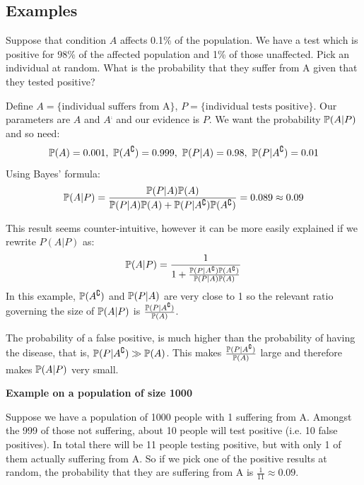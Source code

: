 \documentclass[../main.tex]{subfiles}
\begin{document}
\subsection{Examples}
\begin{example}
  Suppose that condition $A$ affects 0.1\% of the population.
  We have a test which is positive for 98\% of the affected population and 1\% of those unaffected.
  Pick an individual at random.
  What is the probability that they suffer from A given that they tested positive?

  Define $A = \{\text{individual suffers from A}\}$, $P =\{\text{individual tests positive}\}$.
  Our parameters are $A$ and $A^{\comp}$ and our evidence is $P$.
  We want the probability $\P(A \vert P)$ and so need:
  \[
    \P(A) = 0.001,\ \P(A^{\comp}) = 0.999,\ \P(P \vert A) = 0.98,\ \P(P \vert A^{\comp}) = 0.01
  \]
  Using Bayes' formula:
  \[
    \P(A \vert P) = \frac{\P(P \vert A)\P(A)}{\P(P \vert A)\P(A) + \P(P \vert A^{\comp})\P(A^{\comp})} = 0.089 \approx 0.09
  \]

  This result seems counter-intuitive, however it can be more easily explained if we rewrite $P(A \vert P)$ as:
  \[
    \P(A \vert P) = \frac{1}{1 + \frac{\P(P \vert A^{\comp})\P(A^{\comp})}{\P(P \vert A)\P(A)}}
  \]
  In this example, $\P(A^{\comp})$ and $\P(P \vert A)$ are very close to 1 so the relevant ratio governing the size of $\P(A \vert P)$ is $\frac{\P(P \vert A^{\comp})}{\P(A)}$.

  The probability of a false positive, is much higher than the probability of having the disease, that is, $\P(P \vert A^{\comp}) \gg \P(A)$.
  This makes $\frac{\P(P \vert A^{\comp})}{\P(A)}$ large and therefore makes $\P(A \vert P)$ very small.

  \textbf{Example on a population of size 1000}\par
  Suppose we have a population of 1000 people with 1 suffering from A.
  Amongst the 999 of those not suffering, about 10 people will test positive (i.e. 10 false positives).
  In total there will be 11 people testing positive, but with only 1 of them actually suffering from A.
  So if we pick one of the positive results at random, the probability that they are suffering from A is $\frac{1}{11} \approx 0.09$.
\end{example}
\end{document}
